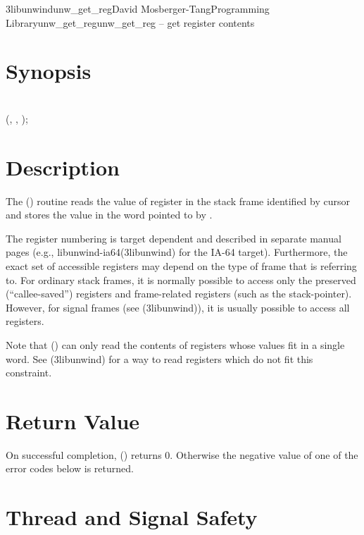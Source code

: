 \documentclass{article}
\begin{document}
\begin{Name}{3libunwind}{unw\_get\_reg}{David Mosberger-Tang}{Programming Library}{unw\_get\_reg}unw\_get\_reg -- get register contents
\end{Name}

\section{Synopsis}

\\

 (,  , );\\

\section{Description}

The () routine reads the value of register
 in the stack frame identified by cursor  and stores
the value in the word pointed to by .

The register numbering is target dependent and described in separate
manual pages (e.g., libunwind-ia64(3libunwind) for the IA-64 target).
Furthermore, the exact set of accessible registers may depend on the
type of frame that  is referring to.  For ordinary stack
frames, it is normally possible to access only the preserved
(``callee-saved'') registers and frame-related registers (such as the
stack-pointer).  However, for signal frames (see
(3libunwind)), it is usually possible to access
all registers.

Note that () can only read the contents of
registers whose values fit in a single word.  See
(3libunwind) for a way to read registers which do not fit
this constraint.

\section{Return Value}

On successful completion, () returns 0.
Otherwise the negative value of one of the error codes below is
returned.

\section{Thread and Signal Safety}
\end{document}
